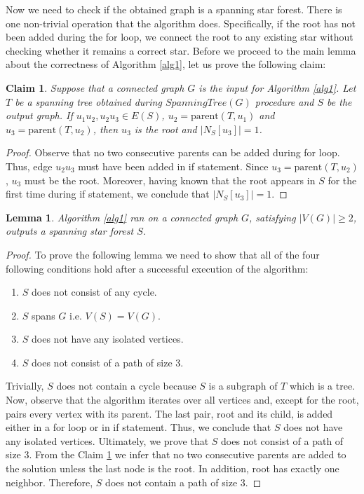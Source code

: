 \documentclass[en]{pracamgr}
\newtheorem{lemma}{Lemma}
\newtheorem{claim}{Claim}
\begin{document}
Now we need to check if the obtained graph is a spanning star forest. There is one non-trivial operation that the algorithm does. Specifically, if the root has not  been added during the for loop, we connect the root to any existing star without checking whether it remains a correct star. Before we proceed to the main lemma about the correctness of Algorithm \ref{alg1}, let us prove the following claim:

\begin{claim}\label{ssf root}
	Suppose that a connected graph $G$ is the input for Algorithm \ref{alg1}. Let $T$ be a spanning tree obtained during $SpanningTree(G)$ procedure and $S$ be the output graph. If $u_1 u_2,u_2 u_3 \in E(S)$, $u_2 = \textrm{parent}(T,u_1)$ and $u_3=\textrm{parent}(T,u_2)$, then $u_3$ is the root and $|N_S[u_3]|=1$.
\end{claim}

\begin{proof}
	Observe that no two consecutive parents can be added during for loop. Thus, edge $u_2 u_3$ must have been added in if statement. Since $u_3 = \textrm{parent}(T,u_2)$, $u_3$ must be the root. Moreover, having known that the root appears in $S$ for the first time during if statement, we conclude that $|N_S[u_3]|=1$. 
\end{proof}

\begin{lemma}\label{alg1 correctness}
	Algorithm \ref{alg1} ran on a connected graph $G$, satisfying $|V(G)| \geq 2$, outputs a spanning star forest $S$.
\end{lemma}

\begin{proof}
	To prove the following lemma we need to show that all of the four following conditions hold after a successful execution of the algorithm:
	\begin{enumerate}
		\item $S$ does not consist of any cycle.
		\item $S$ spans $G$ i.e. $V(S) = V(G)$.
		\item $S$ does not have any isolated vertices.
		\item $S$ does not consist of a path of size $3$.
	\end{enumerate}
	Trivially, $S$ does not contain a cycle because $S$ is a subgraph of $T$ which is a tree. Now, observe that the algorithm iterates over all vertices and, except for the root, pairs every vertex with its parent. The last pair, root and its child, is added either in a for loop or in if statement. Thus, we conclude that $S$ does not have any isolated vertices. Ultimately, we prove that $S$ does not consist of a path of size $3$. From the Claim \ref{ssf root} we infer that no two consecutive parents are added to the solution unless the last node is the root. In addition, root has exactly one neighbor. Therefore, $S$ does not contain a path of size $3$.
\end{proof}
\end{document}
